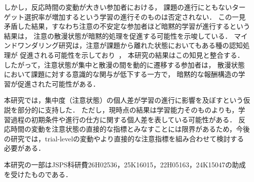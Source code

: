 しかし，反応時間の変動が大きい参加者における，
課題の進行にともないターゲット選択率が増加するという学習の進行そのものは否定されない．
この一見矛盾した結果，すなわち注意の不安定な参加者ほど暗黙的学習が進行するという結果は，
注意の散漫状態が暗黙的処理を促進する可能性を示唆している．
マインドワンダリング研究は，注意が課題から離れた状態においてもある種の認知処理が
促進される可能性を示しており~\cite{simor2025mind,decker2023pay}，
本研究の結果はこの知見と整合する．
したがって，注意状態が集中と散漫の間を動的に遷移する参加者は，
散漫状態において課題に対する意識的な関与が低下する一方で，
暗黙的な報酬構造の学習が促進された可能性がある．

本研究では，集中度（注意状態）の個人差が学習の進行に影響を及ぼすという仮説を部分的に支持した．
ただし，現時点の結果は学習能力そのものよりも，学習過程の初期条件や進行の仕方に関する個人差を表している可能性がある．
反応時間の変動を注意状態の直接的な指標とみなすことには限界があるため，今後の研究では，trial-levelの変動やより直接的な注意指標を組み合わせて検討する必要がある．

本研究の一部はJSPS科研費26H02536，25K16015，22H05163，24K15047の助成を受けたものである．





